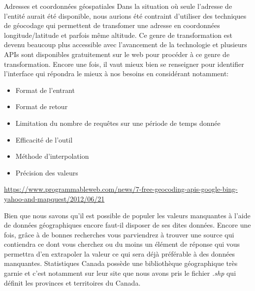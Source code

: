 \begin{moreInfo}{Adresses et coordonnées géospatiales}
	Dans la situation où seule l'adresse de l'entité aurait été disponible, nous aurions été contraint d'utiliser des techniques de géocodage qui permettent de transfomer une adresse en coordonnées longitude/latitude et parfois même altitude. Ce genre de transformation est devenu beaucoup plus accessible avec l'avancement de la technologie et plusieurs APIs sont disponibles gratuitement sur le web pour procéder à ce genre de transformation. Encore une fois, il vaut mieux bien se renseigner pour identifier l'interface qui répondra le mieux à nos besoins en considérant notamment:
	\begin{itemize}
		\item Format de l'entrant
		\item Format de retour
		\item Limitation du nombre de requêtes sur une période de temps donnée
		\item Efficacité de l'outil
		\item Méthode d'interpolation
		\item Précision des valeurs
	\end{itemize}
	\url{https://www.programmableweb.com/news/7-free-geocoding-apis-google-bing-yahoo-and-mapquest/2012/06/21}
\end{moreInfo}

\noindent
Bien que nous savons qu'il est possible de populer les valeurs manquantes à l'aide de données géographiques encore faut-il disposer de ses dites données. Encore une fois, grâce à de bonnes recherches vous parviendrez à trouver une source qui contiendra ce dont vous cherchez ou du moins un élément de réponse qui vous permettra d'en extrapoler la valeur ce qui sera déjà préférable à des données manquantes. Statistiques Canada possède une bibliothèque géographique très garnie et c'est notamment sur leur site que nous avons pris le fichier \emph{.shp} qui définit les provinces et territoires du Canada.


